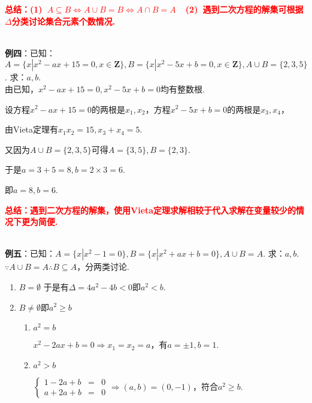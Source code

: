 \documentclass[8pt]{article}
\begin{document}
				\textcolor{red}{\textbf{总结：(1)\ $A\subseteq B\Leftrightarrow A\cup B=B \Leftrightarrow A\cap B=A$\ \ (2)\ 遇到二次方程的解集可根据$\Delta$分类讨论集合元素个数情况.}}

				~\\

				\textbf{例四}：已知：$A=\{x|x^2-ax+15=0, x\in\mathbf{Z}\}, B=\{x|x^2-5x+b=0, x\in\mathbf{Z}\}, A\cup B=\{2,3,5\}$. 求：$a, b$.
				~\\

				由已知，$x^2-ax+15=0, x^2-5x+b=0$均有整数根.

				设方程$x^2-ax+15=0$的两根是$x_1, x_2$，方程$x^2-5x+b=0$的两根是$x_3, x_4$，

				由Vieta定理有$x_1x_2=15, x_3+x_4=5$.

				又因为$A\cup B=\{2,3,5\}$可得$A=\{3,5\}, B=\{2,3\}$.

				于是$a=3+5=8, b=2\times 3=6.$

				即$a=8, b=6.$

				\textcolor{red}{\textbf{总结：遇到二次方程的解集，使用Vieta定理求解相较于代入求解在变量较少的情况下更为简便.}}

				~\\

				\textbf{例五}：已知：$A=\{x|x^2-1=0\}, B=\{x|x^2+ax+b=0\}, A\cup B=A$. 求：$a, b$.
				~\\

				$\because A\cup B=A \therefore B\subseteq A，$分两类讨论.

				\begin{enumerate}[label=$\arabic*^{\circ}$]
					\item $B=\emptyset$
						于是有$\Delta = 4a^2-4b<0$即$a^2<b$.

					\item $B\neq \emptyset$即$a^2\geq b$

						\begin{enumerate}[label=$2.\arabic*^{\circ}$]
							\item $a^2=b$

								$x^2-2ax+b=0\Rightarrow x_1=x_2=a$，有$a=\pm1, b=1.$

							\item $a^2>b$

								$\displaystyle\left\{\begin{array}{rcl}1-2a+b&=&0\\a+2a+b&=&0\end{array}\right.\Rightarrow(a,b)=(0,-1)$，符合$a^2\geq b$.
						
						\end{enumerate}
				\end{enumerate}
\end{document}
